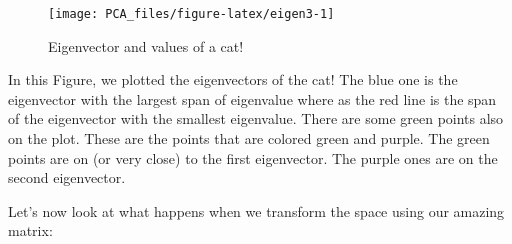 \documentclass[
]{book}
\theoremstyle{definition}
\theoremstyle{definition}
\theoremstyle{definition}
\theoremstyle{remark}
\begin{document}
\begin{figure}

{\centering \texttt{[image: PCA\_files/figure-latex/eigen3-1]} 

}

\caption{Eigenvector and values of a cat!}\label{fig:eigen3}
\end{figure}

In this Figure, we plotted the eigenvectors of the cat! The blue one is the eigenvector with the largest span of eigenvalue where as the red line is the span of the eigenvector with the smallest eigenvalue.
There are some green points also on the plot. These are the points that are colored green and purple. The green points are on (or very close) to the first eigenvector. The purple ones are on the second eigenvector.

Let's now look at what happens when we transform the space using our amazing matrix:
\end{document}
